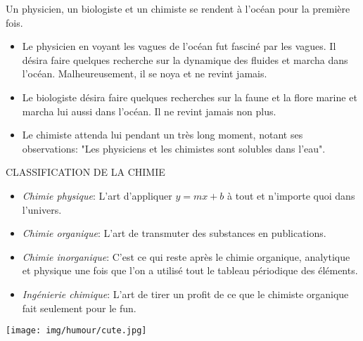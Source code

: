 \begin{center}\underline{\hspace{5 cm}}\end{center}

Un physicien, un biologiste et un chimiste se rendent à l'océan pour la première fois. 

\begin{itemize}
	\item Le physicien en voyant les vagues de l'océan fut fasciné par les vagues. Il désira faire quelques recherche sur la dynamique des fluides et marcha dans l'océan. Malheureusement, il se noya et ne revint jamais. 

	\item Le biologiste désira faire quelques recherches sur la faune et la flore marine et marcha lui aussi dans l'océan. Il ne revint jamais non plus.

	\item Le chimiste attenda lui pendant un très long moment, notant ses observations: "Les physiciens et les chimistes sont solubles dans l'eau".
\end{itemize}

\begin{center}\underline{\hspace{5 cm}}\end{center}

CLASSIFICATION DE LA CHIMIE

\begin{itemize}
	\item \textit{Chimie physique}: L'art d'appliquer $y=mx+b$ à tout et n'importe quoi dans l'univers.

	\item \textit{Chimie organique}: L'art de transmuter des substances en publications.

	\item \textit{Chimie inorganique}: C'est ce qui reste après le chimie organique, analytique et physique une fois que l'on a utilisé tout le tableau périodique des éléments.

	\item \textit{Ingénierie chimique}:  L'art de tirer un profit de ce que le chimiste organique fait seulement pour le fun.
\end{itemize}
\begin{center}\underline{\hspace{5 cm}}\end{center}

\begin{center}
\texttt{[image: img/humour/cute.jpg]}
\end{center}

